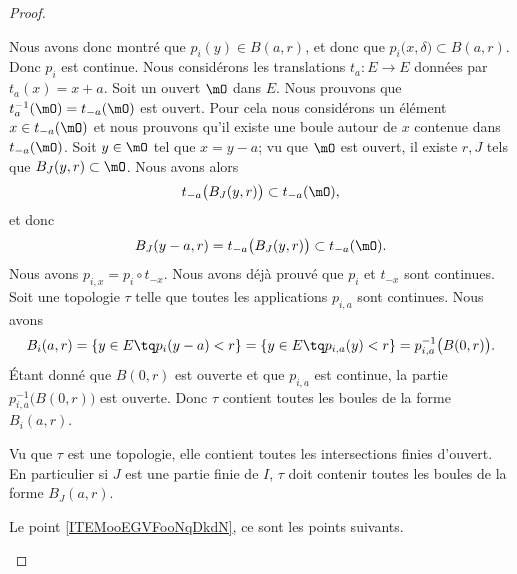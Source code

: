 \begin{proof}
\begin{subproof}
		Nous avons donc montré que \( p_i(y)\in B(a,r)\), et donc que \( p_i\big( x,\delta \big)\subset B(a,r)\). Donc \( p_i\) est continue.
		Nous considérons les translations \(t_a \colon E\to E  \) données par \( t_a(x)=x+a\). Soit un ouvert \( \mO\) dans \( E\). Nous prouvons que \( t^{-1}_a(\mO)=t_{-a}(\mO)\) est ouvert. Pour cela nous considérons un élément \( x\in t_{-a}(\mO)\) et nous prouvons qu'il existe une boule autour de \( x\) contenue dans \( t_{-a}(\mO)\). Soit \( y\in \mO\) tel que \( x=y-a\); vu que \( \mO\) est ouvert, il existe \( r,J\) tels que \( B_J(y,r)\subset \mO\). Nous avons alors
		\begin{equation}
			t_{-a}\big( B_J(y,r) \big)\subset t_{-a}(\mO),
		\end{equation}
		et donc
		\begin{equation}
			B_J(y-a,r)=t_{-a}\big( B_J(y,r) \big)\subset t_{-a}(\mO).
		\end{equation}
		Nous avons \( p_{i,x}=p_i\circ t_{-x}\). Nous avons déjà prouvé que \( p_i\) et \( t_{-x}\) sont continues.
		Soit une topologie \( \tau\) telle que toutes les applications \( p_{i,a}\) sont continues. Nous avons
		\begin{equation}
			B_i(a,r)=\{ y\in E\tq p_i(y-a)<r \}=\{ y\in E\tq p_{i,a}(y)<r \}=p_{i,a}^{-1}\big( B(0,r) \big).
		\end{equation}
		Étant donné que \( B(0,r)\) est ouverte et que \( p_{i,a}\) est continue, la partie \( p_{i,a}^{-1}\big( B(0,r) \big)\) est ouverte. Donc \( \tau\) contient toutes les boules de la forme \( B_i(a,r)\).

		Vu que \( \tau\) est une topologie, elle contient toutes les intersections finies d'ouvert. En particulier si \( J\) est une partie finie de \( I\), \( \tau\) doit contenir toutes les boules de la forme \( B_J(a,r)\).

		Le point \ref{ITEMooEGVFooNqDkdN}, ce sont les points suivants.


\end{subproof}
\end{proof}
